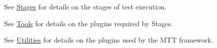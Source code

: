 See \hyperlink{group___stages}{Stages} for details on the stages of test execution.\par
 See \hyperlink{group___tools}{Tools} for details on the plugins required by Stages.\par
 See \hyperlink{group___utilities}{Utilities} for details on the plugins used by the M\-T\-T framework.\par
